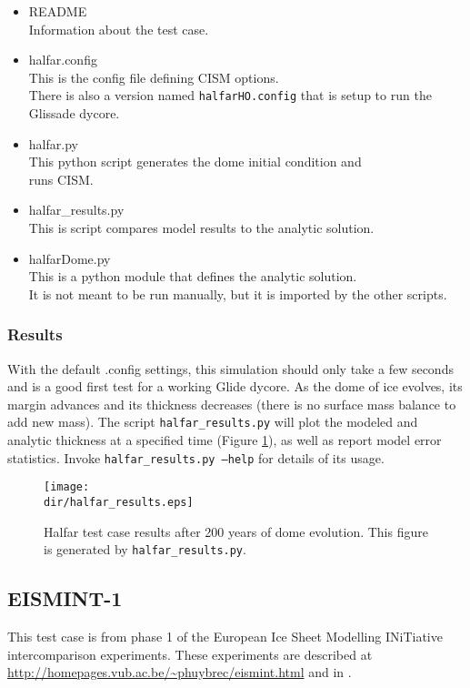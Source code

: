\begin{itemize}
	\item README \\
		Information about the test case.
	\item halfar.config \\
		This is the config file defining CISM options. \\
    There is also a version named \texttt{halfarHO.config} that is setup to run the Glissade dycore.
	\item halfar.py \\
		This python script generates the dome initial condition and \\
		runs CISM.
	\item halfar\_results.py \\
		This is script compares model results to the analytic solution.
	\item halfarDome.py \\
		This is a python module that defines the analytic solution. \\
    It is not meant to be run manually, but it is imported by the other scripts.
\end{itemize}

\subsubsection{Results}
\label{subsecc:halfar_results}
With the default .config settings, this simulation should only take a few seconds and is a good first test for a working Glide dycore.
As the dome of ice evolves, its margin advances and its thickness decreases (there is no surface mass balance to add new mass).  The script \texttt{halfar\_results.py} will plot the modeled and analytic thickness at a specified time (Figure \ref{fig:halfarresults}), as well as report model error statistics.  Invoke \texttt{halfar\_results.py --help} for details of its usage.


\begin{figure}[H!]
	\centering
	\texttt{[image: \\dir/halfar\_results.eps]}
	\caption{Halfar test case results after 200 years of dome evolution. This figure is generated by \texttt{halfar\_results.py}.}
	\label{fig:halfarresults}
\end{figure}


\FloatBarrier


\subsection{EISMINT-1}
\label{sec:eismint_description}
This test case is from phase 1 of the European Ice Sheet Modelling INiTiative intercomparison experiments.  These experiments are described at \url{http://homepages.vub.ac.be/~phuybrec/eismint.html} and in \citet{Huybrechts1996}.

